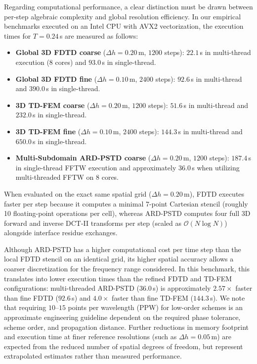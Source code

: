 \documentclass{Configuration_Files/PoliMi3i_thesis}
\newif\ifshowthesischanges
\DeclareRobustCommand{\thesischange}[2]{%
    \ifshowthesischanges
        \textcolor{#1}{#2}%
    \else
        #2%
    \fi
}
\def\thesischange#1#2{#2}%
\begin{document}
\thesischange{red}{Regarding computational performance, a clear distinction must be drawn between per-step algebraic complexity and global resolution efficiency. In our empirical benchmarks executed on an Intel CPU with AVX2 vectorization, the execution times for $T = 0.24$\,s are measured as follows:}
\begin{itemize}
    \item \thesischange{red}{\textbf{Global 3D FDTD coarse} ($\Delta h = 0.20$\,m, $1200$ steps): $22.1$\,s in multi-thread execution ($8$ cores) and $93.0$\,s in single-thread.}
    \item \thesischange{red}{\textbf{Global 3D FDTD fine} ($\Delta h = 0.10$\,m, $2400$ steps): $92.6$\,s in multi-thread and $390.0$\,s in single-thread.}
    \item \thesischange{red}{\textbf{3D TD-FEM coarse} ($\Delta h = 0.20$\,m, $1200$ steps): $51.6$\,s in multi-thread and $232.0$\,s in single-thread.}
    \item \thesischange{red}{\textbf{3D TD-FEM fine} ($\Delta h = 0.10$\,m, $2400$ steps): $144.3$\,s in multi-thread and $650.0$\,s in single-thread.}
    \item \thesischange{red}{\textbf{Multi-Subdomain ARD-PSTD coarse} ($\Delta h = 0.20$\,m, $1200$ steps): $187.4$\,s in single-thread FFTW execution and approximately $36.0$\,s when utilizing multi-threaded FFTW on $8$ cores.}
\end{itemize}

\thesischange{red}{When evaluated on the exact same spatial grid ($\Delta h = 0.20$\,m), FDTD executes faster per step because it computes a minimal 7-point Cartesian stencil (roughly 10 floating-point operations per cell), whereas ARD-PSTD computes four full 3D forward and inverse DCT-II transforms per step (scaled as $\mathcal{O}(N \log N)$) alongside interface residue exchanges.}

\thesischange{red}{Although ARD-PSTD has a higher computational cost per time step than the local FDTD stencil on an identical grid, its higher spatial accuracy allows a coarser discretization for the frequency range considered. In this benchmark, this translates into lower execution times than the refined FDTD and TD-FEM configurations: multi-threaded ARD-PSTD ($36.0$\,s) is approximately $2.57\times$ faster than fine FDTD ($92.6$\,s) and $4.0\times$ faster than fine TD-FEM ($144.3$\,s). We note that requiring $10\text{--}15$ points per wavelength (PPW) for low-order schemes is an approximate engineering guideline dependent on the required phase tolerance, scheme order, and propagation distance. Further reductions in memory footprint and execution time at finer reference resolutions (such as $\Delta h = 0.05$\,m) are expected from the reduced number of spatial degrees of freedom, but represent extrapolated estimates rather than measured performance.}
\end{document}
